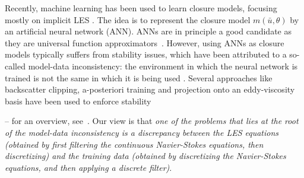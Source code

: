 \documentclass[preprint]{elsarticle}
\newcommand{\R}[1]{}
\newcommand{\revone}[1]{#1}
\begin{document}
Recently, machine learning has been used to learn closure models, focusing
mostly on implicit LES
\cite{Beck2019,Beck2021,Beck2023,Duraisamy2019,Holl2020,Kurz2020,Kurz2021,List2022,Maulik2018,Sirignano2020,Sirignano2023a,Sirignano2023b}.
The idea is to represent the closure model $m(\bar{u},\theta)$ by an artificial
neural network (ANN). ANNs are in principle a good candidate as they are
universal function approximators~\cite{Barron1993,ChenTianping1995}. However,
using ANNs as closure models typically suffers from stability issues, which have
been attributed to a so-called model-data inconsistency: the environment in
which the neural network is trained is not the same in which it is being used
\cite{Beck2023}. Several approaches like backscatter clipping,
a-posteriori training and projection onto an eddy-viscosity basis have been used
to enforce stability
\revone{
    \R{inconsistency}
    \cite{Park2021,Kochkov2021,List2022,Beck2019}
}
--
for an overview, see~\cite{Sanderse2024}. Our view is that
\emph{one of the problems that lies at the root of the model-data inconsistency
is a discrepancy between the LES equations (obtained by first filtering the
continuous Navier-Stokes equations, then discretizing) and the training data
(obtained by discretizing the Navier-Stokes equations, and then applying a
discrete filter)}. 
\end{document}

